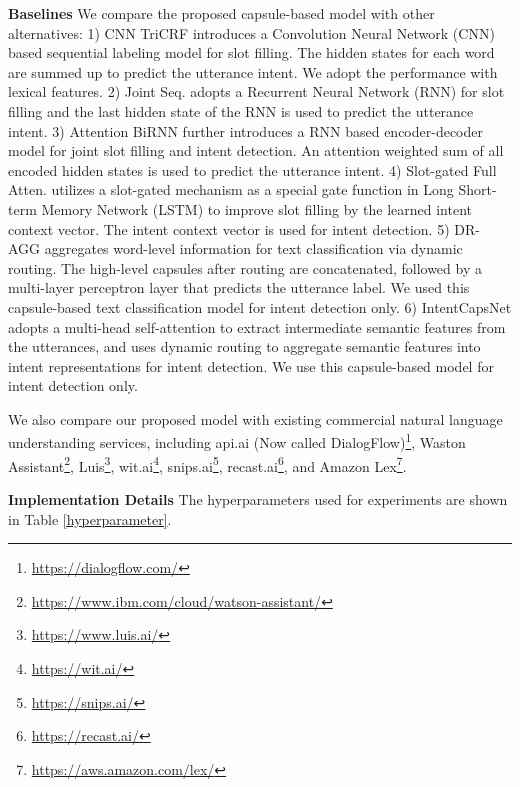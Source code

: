 \noindent\textbf{Baselines}
We compare the proposed capsule-based model {\ModelName} with other alternatives:
1) CNN TriCRF \citep{xu2013convolutional} introduces a Convolution Neural Network (CNN) based sequential labeling model for slot filling. The hidden states for each word are summed up to predict the utterance intent. We adopt the performance with lexical features.
2) Joint Seq. \citep{hakkani2016multi} adopts a Recurrent Neural Network (RNN) for slot filling and the last hidden state of the RNN is used to predict the utterance intent. 
3) Attention BiRNN \citep{liu2016attention} further introduces a RNN based encoder-decoder model for joint slot filling and intent detection. An attention weighted sum of all encoded hidden states is used to predict the utterance intent.
4) Slot-gated Full Atten. \citep{goo2018slot} utilizes a slot-gated mechanism as a special gate function in Long Short-term Memory Network (LSTM) to improve slot filling by the learned intent context vector. The intent context vector is used for intent detection.
5) DR-AGG \citep{gong2018information} aggregates word-level information for text classification via dynamic routing. The high-level capsules after routing are concatenated, followed by a multi-layer perceptron layer that predicts the utterance label. We used this capsule-based text classification model for intent detection only.
6) IntentCapsNet \citep{xia2018zero} adopts a multi-head self-attention to extract intermediate semantic features from the utterances, and uses dynamic routing to aggregate semantic features into intent representations for intent detection. We use this capsule-based model for intent detection only.

We also compare our proposed model {\ModelName} with existing commercial natural language understanding services, including api.ai (Now called DialogFlow)\footnote{\url{https://dialogflow.com/}}, Waston Assistant\footnote{\url{https://www.ibm.com/cloud/watson-assistant/}}, Luis\footnote{\url{https://www.luis.ai/}}, wit.ai\footnote{\url{https://wit.ai/}}, snips.ai\footnote{\url{https://snips.ai/}}, recast.ai\footnote{\url{https://recast.ai/}}, and Amazon Lex\footnote{\url{https://aws.amazon.com/lex/}}.

\noindent\textbf{Implementation Details}
The hyperparameters used for experiments are shown in Table \ref{hyperparameter}.

\begin{table}[ht!]
\centering
{}
\vspace{0.1in}
\caption{Hyperparameter settings.}
\label{hyperparameter}
\end{table}
